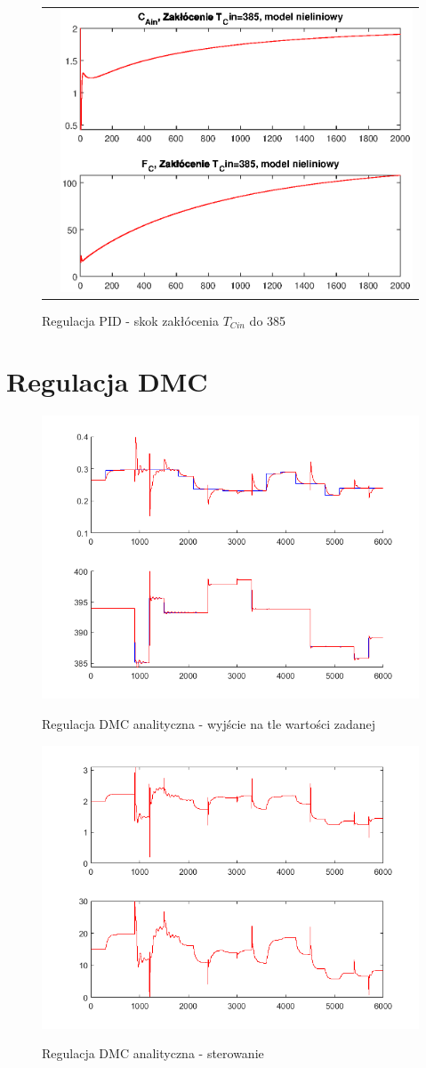 \begin{figure}
\begin{tabular}{cc}
	&
	\includegraphics[width=.5\linewidth]{img/pidnlin/pidnlin15.eps}
\end{tabular}
\label{ch2:pid8}
\caption{Regulacja PID - skok zakłócenia $T_{Cin}$ do 385}
\end{figure}

\section{Regulacja DMC}
\begin{figure}[h!]
	\centering
	\includegraphics[width=.6\linewidth]{img/yDMC.png}
	\label{ch2:Zadanie}
	\caption{Regulacja DMC analityczna - wyjście na tle wartości zadanej}
\end{figure}
\begin{figure}[h!]
	\centering
	\includegraphics[width=.6\linewidth]{img/uDMC.png}
	\label{ch2:Zadanie}
	\caption{Regulacja DMC analityczna - sterowanie}
\end{figure}
